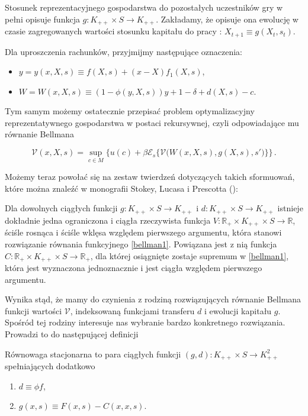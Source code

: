 Stosunek reprezentacyjnego gospodarstwa do pozostałych uczestników gry w pełni opisuje funkcja $ g: K_{++} \times S \rightarrow K_{++} $. Zakładamy, że opisuje ona ewolucję w czasie zagregowanych wartości stosunku kapitału do pracy : $ X_{t+1} \equiv g(X_t, s_t)$.


Dla uproszczenia rachunków, przyjmijmy następujące oznaczenia:

\begin{itemize}
	\item{$y = y(x,X,s) \equiv f(X, s) + (x - X)f_1 (X,s)$,} 
	\item{$W = W(x,X,s) \equiv (1- \phi(y,X,s))y + 1 - \delta + d(X,s) - c $.}	
\end{itemize}

Tym samym możemy ostatecznie przepisać problem optymalizacyjny reprezentatywnego gospodarstwa w postaci rekursywnej, czyli odpowiadające mu równanie Bellmana

\begin{equation}\label{bellman1}
\mathcal{V}(x,X,s) = \underset{c \in M}{\sup} \Biggl\{ u(c) + \beta \mathcal{E}_s \bigl \{ \mathcal{V}\Big(W(x,X,s), g(X,s), s'\Big) \bigl\} \Biggl\}\,.
\end{equation}	

Możemy teraz powołać się na zestaw twierdzeń dotyczących takich sformuowań, które można znaleźć w monografii Stokey, Lucasa i Prescotta (\citeyear{Prescott}):

\begin{tw}
Dla dowolnych ciągłych funkcji $ g: K_{++} \times S \rightarrow	K_{++} $ i $ d: K_{++} \times S \rightarrow	K_{++} $ istnieje dokładnie jedna ograniczona i ciągła rzeczywista funkcja $ V: \mathbb{R}_{+} \times K_{++} \times S \rightarrow \mathbb{R} $, ściśle rosnąca i ściśle wklęsa względem pierwszego argumentu, która stanowi rozwiązanie równania funkcyjnego \ref{bellman1}. Powiązana jest z nią funkcja $ C: \mathbb{R}_{+} \times K_{++} \times S \rightarrow \mathbb{R}_{+}$, dla której osiągnięte zostaje supremum w \ref{bellman1}, która jest wyznaczona jednoznacznie i jest ciągła względem pierwszego argumentu. 
\end{tw}

Wynika stąd, że mamy do czynienia z rodziną rozwiązujących równanie Bellmana funkcji wartości $ \mathcal{V} $, indeksowaną funkcjami transferu $ d $ i ewolucji kapitału $ g $. Spośród tej rodziny interesuje nas wybranie bardzo konkretnego rozwiązania. Prowadzi to do następującej definicji

\begin{definicja}\label{def_equilibrium}
	Równowaga stacjonarna to para ciągłych funkcji $ (g,d): K_{++} \times S \rightarrow	K_{++}^2$ spełniających dodatkowo
	\begin{enumerate}
		\item{ \label{LaJ}$d \equiv \phi f$,}
		\item{ \label{CP}$g(x,s) \equiv F(x,s) - C(x,x,s)$.}
	\end{enumerate}
\end{definicja}

